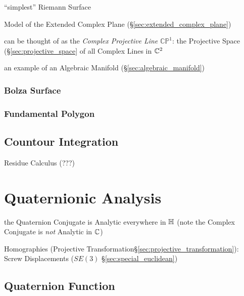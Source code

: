 ``simplest'' Riemann Surface

Model of the Extended Complex Plane
(\S\ref{sec:extended_complex_plane})

can be thought of as the \emph{Complex Projective Line}
$\mathbb{CP}^1$: the Projective Space (\S\ref{sec:projective_space} of
all Complex Lines in $\mathbb{C}^2$

an example of an Algebraic Manifold (\S\ref{sec:algebraic_manifold})



\subsubsection{Bolza Surface}\label{sec:bolza_surface}

\subsubsection{Fundamental Polygon}\label{sec:fundamental_polygon}



\subsection{Countour Integration}\label{sec:contour_integration}

Residue Calculus (???) %



\section{Quaternionic Analysis}\label{sec:quaternionic_analysis}

the Quaternion Conjugate is Analytic everywhere in $\mathbb{H}$
(note the Complex Conjugate is \emph{not} Analytic in $\mathbb{C}$)

Homographies (Projective Transformation\S\ref{sec:projective_transformation}):
Screw Displacements ($SE(3)$ \S\ref{sec:special_euclidean})



\subsection{Quaternion Function}\label{sec:quaternion_function}

